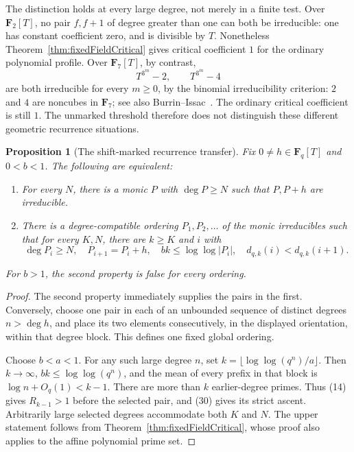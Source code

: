 \documentclass[11pt]{article}
\newtheorem{proposition}[theorem]{Proposition}
\newcommand{\F}{\mathbf F}
\begin{document}
The distinction holds at every large degree, not merely in a finite
test. Over \(\F_2[T]\), no pair \(f,f+1\) of degree greater than one
can both be irreducible: one has constant coefficient zero, and is
divisible by \(T\). Nonetheless Theorem~\ref{thm:fixedFieldCritical}
gives critical coefficient \(1\) for the ordinary polynomial profile.
Over \(\F_7[T]\), by contrast,
\[
                         T^{3^m}-2,\qquad T^{3^m}-4
\]
are both irreducible for every \(m\geq0\), by the binomial
irreducibility criterion: \(2\) and \(4\) are noncubes in \(\F_7\);
see also Burrin--Issac~\cite{BurrinIssac}.
The ordinary critical coefficient is still \(1\).
The unmarked threshold therefore does not distinguish these
different geometric recurrence situations.

\begin{proposition}[The shift-marked recurrence transfer]
\label{prop:shiftMarkedTransfer}
Fix \(0\ne h\in\F_q[T]\) and \(0<b<1\).
The following are equivalent:
\begin{enumerate}
\item For every \(N\), there is a monic \(P\) with
\(\deg P\geq N\) such that \(P,P+h\) are irreducible.
\item There is a degree-compatible ordering \(P_1,P_2,\ldots\) of
the monic irreducibles such that for every \(K,N\), there are
\(k\geq K\) and \(i\) with
\[
 \deg P_i\geq N,\quad P_{i+1}=P_i+h,\quad
 bk\leq\log\log|P_i|,\quad
 d_{q,k}(i)<d_{q,k}(i+1).
\]
\end{enumerate}
For \(b>1\), the second property is false for every ordering.
\end{proposition}
\begin{proof}
The second property immediately supplies the pairs in the first.
Conversely, choose one pair in each of an unbounded sequence of distinct
degrees \(n>\deg h\), and place its two elements consecutively,
in the displayed orientation, within that degree block.
This defines one fixed global ordering.

Choose \(b<a<1\). For any such large degree \(n\), set
\(k=\lfloor\log\log(q^n)/a\rfloor\).
Then \(k\to\infty\), \(bk\leq\log\log(q^n)\), and the mean of
every prefix in that block is
\(\log n+O_q(1)<k-1\).
There are more than \(k\) earlier-degree primes.
Thus (14) gives \(R_{k-1}>1\) before the selected pair,
and (30) gives its strict ascent.
Arbitrarily large selected degrees accommodate both \(K\) and \(N\).
The upper statement follows from
Theorem~\ref{thm:fixedFieldCritical}, whose proof also applies to the
affine polynomial prime set.
\end{proof}
\end{document}
